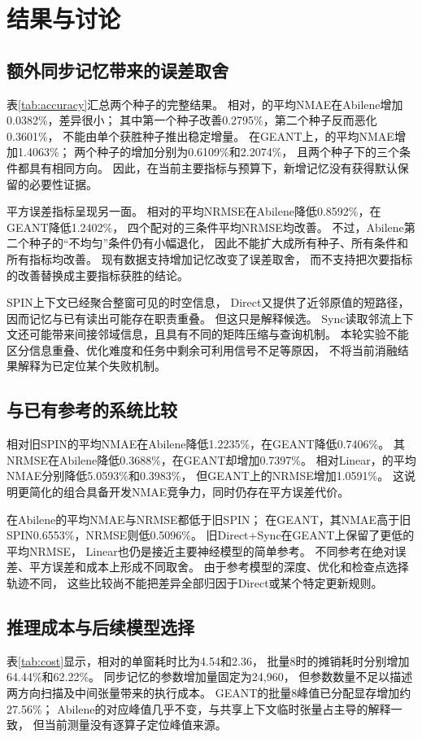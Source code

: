 \section{结果与讨论}
\subsection{额外同步记忆带来的误差取舍}
表\ref{tab:accuracy}汇总两个种子的完整结果。
相对\lite，\full 的平均NMAE在Abilene增加0.0382\%，差异很小；
其中第一个种子改善0.2795\%，第二个种子反而恶化0.3601\%，
不能由单个获胜种子推出稳定增量。
在GEANT上，\full 的平均NMAE增加1.4063\%；
两个种子的增加分别为0.6109\%和2.2074\%，
且两个种子下的三个条件都具有相同方向。
因此，在当前主要指标与预算下，新增记忆没有获得默认保留的必要性证据。

平方误差指标呈现另一面。
\full 相对\lite 的平均NRMSE在Abilene降低0.8592\%，在GEANT降低1.2402\%，
四个配对的三条件平均NRMSE均改善。
不过，Abilene第二个种子的“不均匀”条件仍有小幅退化，
因此不能扩大成所有种子、所有条件和所有指标均改善。
现有数据支持增加记忆改变了误差取舍，
而不支持把次要指标的改善替换成主要指标获胜的结论。

SPIN上下文已经聚合整窗可见的时空信息，
Direct又提供了近邻原值的短路径，因而记忆与已有读出可能存在职责重叠。
但这只是解释候选。
Sync读取邻流上下文还可能带来间接邻域信息，且具有不同的矩阵压缩与查询机制。
本轮实验不能区分信息重叠、优化难度和任务中剩余可利用信号不足等原因，
不将当前消融结果解释为已定位某个失败机制。

\subsection{与已有参考的系统比较}
\lite 相对旧SPIN的平均NMAE在Abilene降低1.2235\%，在GEANT降低0.7406\%。
其NRMSE在Abilene降低0.3688\%，在GEANT却增加0.7397\%。
相对Linear，\lite 的平均NMAE分别降低5.0593\%和0.3983\%，
但GEANT上的NRMSE增加1.0591\%。
这说明更简化的组合具备开发NMAE竞争力，同时仍存在平方误差代价。

\full 在Abilene的平均NMAE与NRMSE都低于旧SPIN；
在GEANT，其NMAE高于旧SPIN0.6553\%，NRMSE则低0.5096\%。
旧Direct+Sync在GEANT上保留了更低的平均NRMSE，
Linear也仍是接近主要神经模型的简单参考。
不同参考在绝对误差、平方误差和成本上形成不同取舍。
由于参考模型的深度、优化和检查点选择轨迹不同，
这些比较尚不能把差异全部归因于Direct或某个特定更新规则。

\subsection{推理成本与后续模型选择}
表\ref{tab:cost}显示，\full 相对\lite 的单窗耗时比为4.54和2.36，
批量8时的摊销耗时分别增加64.44\%和62.22\%。
同步记忆的参数增加量固定为24,960，
但参数数量不足以描述两方向扫描及中间张量带来的执行成本。
GEANT的批量8峰值已分配显存增加约27.56\%；
Abilene的对应峰值几乎不变，与共享上下文临时张量占主导的解释一致，
但当前测量没有逐算子定位峰值来源。


